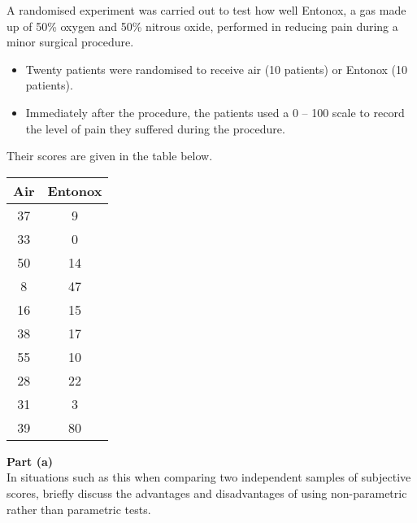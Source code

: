 \documentclass[a4paper,12pt]{article}
\begin{document}
\begin{framed}

\large
\noindent A randomised experiment was carried out to test how well Entonox, a gas made up of 50\% oxygen and 50\% nitrous oxide, performed in reducing pain during a minor surgical procedure.  

\begin{itemize}
    \item Twenty patients were randomised to receive air (10 patients) or Entonox (10 patients).  
    \item Immediately after the procedure, the patients used a 0 – 100 scale to record the level of pain they suffered during the procedure. 
\end{itemize} Their scores are given in the table below. 
 
\begin{center}
\begin{tabular}{|c|c|}
\hline
Air & Entonox \\ \hline \hline
37 & 9 \\ \hline
33 & 0 \\ \hline
\phantom{space}50\phantom{space} & \phantom{space}14 \phantom{space}\\ \hline
 8 & 47 \\ \hline
16 & 15 \\ \hline 
38 & 17 \\ \hline
55 & 10 \\ \hline
28 & 22 \\ \hline
31 & 3 \\ \hline
39 & 80 \\ \hline 
\end{tabular}
\end{center}
\end{framed}
\newpage
\begin{framed}
\noindent \large \textbf{Part (a)} \\
\large
In situations such as this when comparing two independent samples of subjective scores, briefly discuss the advantages and disadvantages of using non-parametric rather than parametric tests. 

\end{framed}
\large
\end{document}
